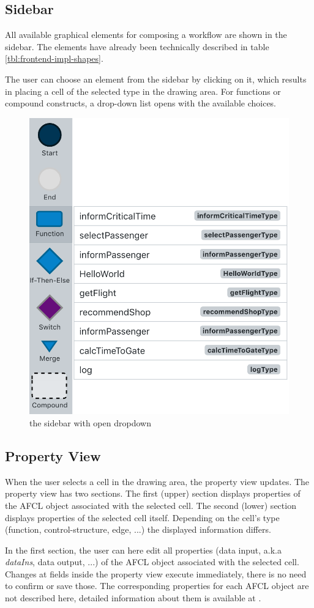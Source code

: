 \documentclass[a4paper,top=25mm,bottom=25mm,12pt,pdftex,halfparskip,twoside,bibtotoc,numbers=noenddot]{scrbook}
\begin{document}
\subsection{Sidebar}

All available graphical elements for composing a workflow are shown in the sidebar. The elements have already been technically described in table \ref{tbl:frontend-impl-shapes}.

The user can choose an element from the sidebar by clicking on it, which results in placing a cell of the selected type in the drawing area. For functions or compound constructs, a drop-down list opens with the available choices.

\begin{figure}[H]
\centering
\includegraphics[width=.4\textwidth]{sidebar}
\caption{the sidebar with open dropdown}
\label{fig:editor-sidebar}
\end{figure}

\subsection{Property View}

When the user selects a cell in the drawing area, the property view updates. The property view has two sections. The first (upper) section displays properties of the AFCL object associated with the selected cell. The second (lower) section displays properties of the selected cell itself. Depending on the cell's type (function, control-structure, edge, ...) the displayed information differs.

In the first section, the user can here edit all properties (data input, a.k.a \textit{dataIns}, data output, ...) of the AFCL object associated with the selected cell. Changes at fields inside the property view execute immediately, there is no need to confirm or save those.
The corresponding properties for each AFCL object are not described here, detailed information about them is available at \citep{online-afcl-dps}.
\end{document}
